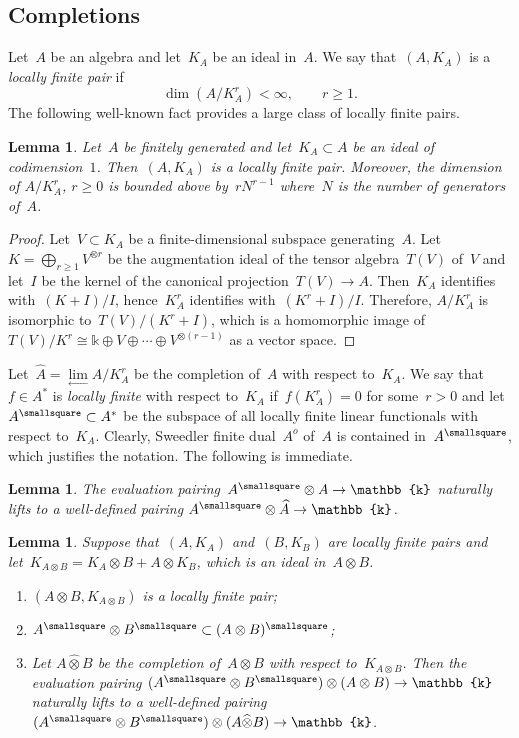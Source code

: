 \documentclass[12pt, reqno]{amsart}
\newcommand{\wh}[1]{\widehat{#1}}
\newtheorem{lemma}[theorem]{Lemma}
\theoremstyle{definition}
\numberwithin{equation}{section}
\newcommand{\tensor}{\otimes}
\newcommand{\kk}{\mathbb{k}}\newcommand{\lie}[1]{{\mathfrak{#1}}}
\newenvironment{enumalph}{\begin{enumerate}[label={\rm(\alph*)},leftmargin=*]}{\end{enumerate}}
\begin{document}
\subsection{Completions}\label{subs:compl}
Let~$A$ be an algebra and let~$K_A$ be an ideal in~$A$. We say
that~$(A,K_A)$ is a {\em locally finite pair} 
if
\begin{equation}\label{eq:cnd loc finite}
\dim(A/K_A^{r})<\infty,\qquad r\ge 1.\end{equation}
The following well-known fact provides 
a large class of locally finite pairs.
\begin{lemma}\label{lem:counit locally finite}
Let~$A$ be finitely generated and let~$K_A\subset A$
be an ideal of codimension~$1$. Then~$(A,K_A)$ is 
a locally finite pair. 
Moreover, the dimension of
$A/K_A^r$, $r\ge 0$ is bounded above by~$r N^{r-1}$ where~$N$
is the number of generators of~$A$.
\end{lemma}
\begin{proof}
Let~$V\subset K_A$ be a finite-dimensional subspace generating~$A$. Let~$K=\bigoplus_{r\ge 1}V^{\tensor r}$ be the augmentation ideal of the tensor algebra~$T(V)$ of~$V$
and let~$I$ be the kernel of the
canonical projection~$T(V)\to A$. Then~$K_A$ identifies
with~$(K+I)/I$, hence~$K_A^r$ identifies with~$(K^r+I)/I$.
Therefore, $A/K_A^{r}$ is isomorphic 
to~$T(V)/(K^{r}+I)$, which is a homomorphic 
image of~$T(V)/K^{r}\cong \kk\oplus V\oplus\cdots 
\oplus V^{\tensor (r-1)}$ as a vector space. 
\end{proof}
Let~$\wh A=\underset{\longleftarrow}\lim  A/K_A^r$
be the completion of~$A$ with respect to~$K_A$. 
We say that~$f\in A^*$ is {\em locally finite} with respect to~$K_A$ if~$f(K_A^r)=0$ for some~$r>0$ and 
let~$A^{\smallsquare}\subset A^*$ be the subspace of all locally finite linear functionals with respect to~$K_A$.
Clearly,
Sweedler finite dual~$A^o$ of~$A$ is
contained in~$A^{\smallsquare}$, which justifies the notation.  
The following is immediate.
\begin{lemma}\label{lem:restr dual}
The evaluation pairing~$A^{\smallsquare}\tensor A\to \kk$ naturally lifts to a well-defined pairing
$A^{\smallsquare}\tensor \wh A\to \kk$. 
\end{lemma}
\begin{lemma}\label{lem:tens completion}
Suppose that~$(A,K_A)$ and~$(B,K_B)$ are locally finite pairs and let~$K_{A\tensor B}=K_A\tensor B+A\tensor K_B$,
which is an ideal in~$A\tensor B$.
\begin{enumalph}
    \item\label{lem:tens completion.a} $(A\tensor B,K_{A\tensor B})$ is a locally finite pair;
    \item\label{lem:tens completion.b} $A^{\smallsquare}\tensor B^{\smallsquare}
    \subset (A\tensor B)^{\smallsquare}$;
    \item\label{lem:tens completion.c} Let $A\wh\tensor B$ be the completion
    of~$A\tensor B$ with respect to~$K_{A\tensor B}$.
    Then the evaluation pairing $(A^{\smallsquare}\tensor B^{\smallsquare})\tensor 
    (A\tensor B)\to \kk$ naturally lifts to a 
    well-defined pairing $(A^{\smallsquare}\tensor B^{\smallsquare})\tensor (A\wh\tensor B)\to\kk$.
\end{enumalph}
\end{lemma}
\end{document}
